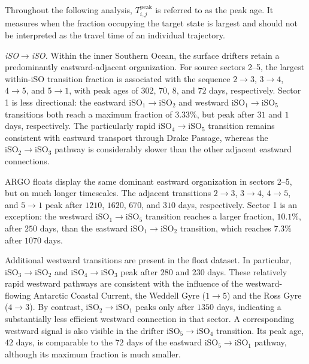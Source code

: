 \documentclass[
  draft
]{agujournal2025}
\begin{document}
                Throughout the following analysis, $T_{i,j}^{\mathrm{peak}}$ is referred to as the peak age. It measures when the fraction occupying the target state is largest and should not be interpreted as the travel time of an individual trajectory.
    
                \medskip
                \noindent
                \textit{iSO$\boldsymbol{\rightarrow}$iSO.}
                Within the inner Southern Ocean, the surface drifters retain a predominantly eastward-adjacent organization. For source sectors 2--5, the largest within-iSO transition fraction is associated with the sequence $2\rightarrow3$, $3\rightarrow4$, $4\rightarrow5$, and $5\rightarrow1$, with peak ages of $302$, $70$, $8$, and $72$ days, respectively. Sector 1 is less directional: the eastward $\mathrm{iSO}_1 \rightarrow \mathrm{iSO}_2$ and westward $\mathrm{iSO}_1 \rightarrow \mathrm{iSO}_5$ transitions both reach a maximum fraction of $3.33 \%$, but peak after $31$ and $1$ days, respectively. The particularly rapid $\mathrm{iSO}_4 \rightarrow \mathrm{iSO}_5$ transition remains consistent with eastward transport through Drake Passage, whereas the $\mathrm{iSO}_2 \rightarrow \mathrm{iSO}_3$ pathway is considerably slower than the other adjacent eastward connections.
    
                ARGO floats display the same dominant eastward organization in sectors 2--5, but on much longer timescales. The adjacent transitions $2\rightarrow3$, $3\rightarrow4$, $4\rightarrow5$, and $5\rightarrow1$ peak after $1210$, $1620$, $670$, and $310$ days, respectively. Sector 1 is an exception: the westward $\mathrm{iSO}_1 \rightarrow \mathrm{iSO}_5$ transition reaches a larger fraction, $10.1 \%$, after $250$ days, than the eastward $\mathrm{iSO}_1 \rightarrow \mathrm{iSO}_2$ transition, which reaches $7.3 \%$ after $1070$ days.
    
                Additional westward transitions are present in the float dataset. In particular, $\mathrm{iSO}_3 \rightarrow \mathrm{iSO}_2$ and $\mathrm{iSO}_4 \rightarrow \mathrm{iSO}_3$ peak after $280$ and $230$ days. These relatively rapid westward pathways are consistent with the influence of the westward-flowing Antarctic Coastal Current, the Weddell Gyre ($1 \rightarrow 5$) and the Ross Gyre ($4 \rightarrow 3$). By contrast, $\mathrm{iSO}_2 \rightarrow \mathrm{iSO}_1$ peaks only after $1350$ days, indicating a substantially less efficient westward connection in that sector. A corresponding westward signal is also visible in the drifter $\mathrm{iSO}_5 \rightarrow \mathrm{iSO}_4$ transition. Its peak age, $42$ days, is comparable to the $72$ days of the eastward $\mathrm{iSO}_5 \rightarrow \mathrm{iSO}_1$ pathway, although its maximum fraction is much smaller.
    
\end{document}
